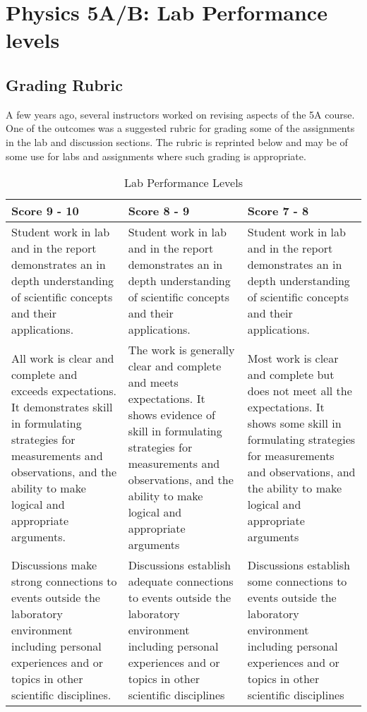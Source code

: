 \chapter{Physics 5A/B: Lab Performance levels}
\section{Grading Rubric}
A few years ago, several instructors worked on revising aspects of the 5A course. One of the outcomes was a suggested rubric for grading some of the assignments in the lab and discussion sections. The rubric is reprinted below and may be of some use for labs and assignments where such grading is appropriate.
\begin{table}[htbp] \caption{Lab Performance Levels} \label{t:performance}
\centering
\begin{tabular}{p{2in}p{2in}p{2in}} \toprule
Score 9 - 10		&Score 8 - 9		&Score 7 - 8\\
\midrule
Student work in lab and in the report demonstrates an in depth understanding of scientific concepts and their applications.
	&Student work in lab and in the report demonstrates an in depth understanding of scientific concepts and their applications.
	&Student work in lab and in the report demonstrates an in depth understanding of scientific concepts and their applications.\\
	\midrule
All work is clear and complete and exceeds expectations. It demonstrates skill in formulating strategies for measurements and observations, and the ability to make logical and appropriate arguments.
	&The work is generally clear and complete and meets expectations. It shows evidence of skill in formulating strategies for measurements and observations, and the ability to make logical and appropriate arguments
	&Most work is clear and complete but does not meet all the expectations. It shows some skill in formulating strategies for measurements and observations, and the ability to make logical and appropriate arguments\\
	\midrule
Discussions make strong connections to events outside the laboratory environment including personal experiences and or topics in other scientific disciplines.
	&Discussions establish adequate connections to events outside the laboratory environment including personal experiences and or topics in other scientific disciplines
	&Discussions establish some connections to events outside the laboratory environment including personal experiences and or topics in other scientific disciplines\\


\end{tabular}
\end{table}
